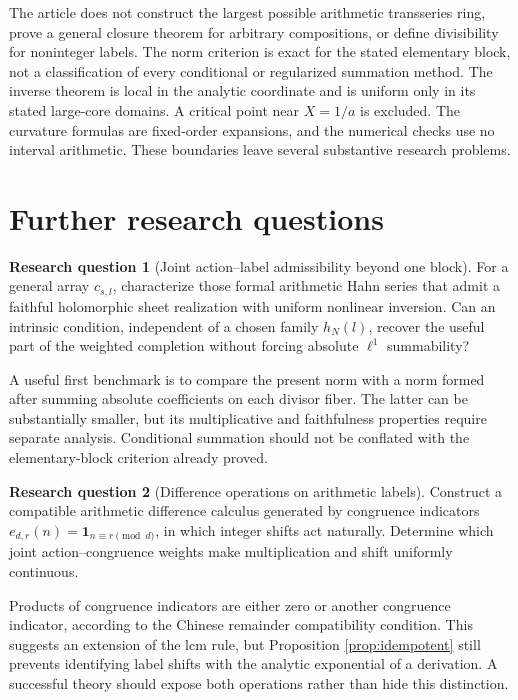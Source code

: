 \documentclass[11pt,a4paper]{article}
\numberwithin{equation}{section}
\theoremstyle{definition}
\newtheorem{question}{Research question}
\theoremstyle{remark}
\newcommand{\ind}{\mathbf 1}
\begin{document}
The article does not construct the largest possible arithmetic
transseries ring, prove a general closure theorem for arbitrary
compositions, or define divisibility for noninteger labels. The
norm criterion is exact for the stated elementary block, not a
classification of every conditional or regularized summation method.
The inverse theorem is local in the analytic coordinate and is
uniform only in its stated large-core domains. A critical point near
$X=1/a$ is excluded. The curvature formulas are fixed-order
expansions, and the numerical checks use no interval arithmetic.
These boundaries leave several substantive research problems.

\section{Further research questions}\label{sec:questions}

\begin{question}[Joint action--label admissibility beyond one block]
For a general array $c_{s,l}$, characterize those formal arithmetic Hahn
series that admit a faithful holomorphic sheet realization with
uniform nonlinear inversion. Can an intrinsic condition, independent of
a chosen family $h_N(l)$, recover the useful part of the weighted
completion without forcing absolute $\ell^1$ summability?
\end{question}
A useful first benchmark is to compare the present norm with a norm
formed after summing absolute coefficients on each divisor fiber.
The latter can be substantially smaller, but its multiplicative and
faithfulness properties require separate analysis. Conditional
summation should not be conflated with the elementary-block criterion
already proved.

\begin{question}[Difference operations on arithmetic labels]
Construct a compatible arithmetic difference calculus generated by
congruence indicators $e_{d,r}(n)=\ind_{n\equiv r\pmod d}$, in which
integer shifts act naturally. Determine which joint action--congruence
weights make multiplication and shift uniformly continuous.
\end{question}
Products of congruence indicators are either zero or another congruence
indicator, according to the Chinese remainder compatibility condition.
This suggests an extension of the lcm rule, but Proposition
\ref{prop:idempotent} still prevents identifying label shifts with the
analytic exponential of a derivation. A successful theory should expose
both operations rather than hide this distinction.
\end{document}
